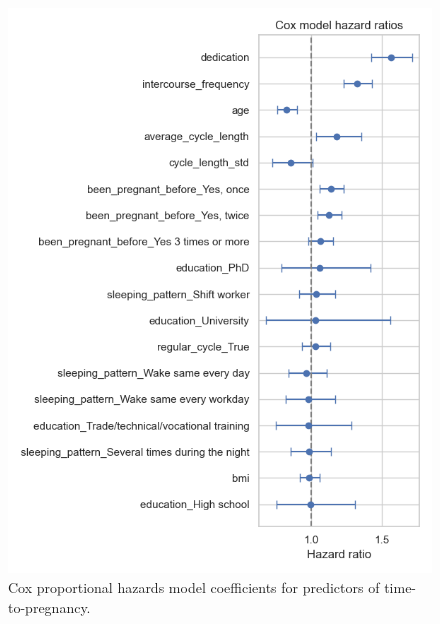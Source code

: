 \documentclass[11pt,a4paper]{article}
\begin{document}
\begin{figure}[htbp]
\centering
\includegraphics[width=0.8\linewidth]{../results/cox_model_coefficients.png}
\caption{Cox proportional hazards model coefficients for predictors of time-to-pregnancy.}
\label{fig:cox_effects}
\end{figure}
\end{document}
